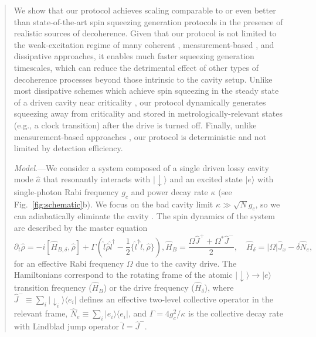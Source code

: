 \begin{abstract}
We show that our protocol achieves scaling comparable to or even better than state-of-the-art spin squeezing generation protocols in the presence of realistic sources of decoherence. 
Given that our protocol is not limited to the weak-excitation  regime of many coherent \cite{Schleier-Smith2010, Borregaard2017, Pedrozo-Penafiel2020, Colombo2022, Borregaard2017a, Luo2024, Leroux2010, Braverman2019, Barberena2023b}, measurement-based \cite{Schleier-Smith2010a, Cox2016, Hosten2016, Thomsen2002, Chen2014,Bao2020, Bowden2020, Robinson2022, Greve2022, Barberena2023b}, and dissipative \cite{DallaTorre2013} approaches, it enables much faster squeezing generation timescales, which can reduce the detrimental effect of other types of decoherence processes beyond those intrinsic to the cavity setup. Unlike most dissipative schemes which achieve spin squeezing in the steady state of a driven cavity near criticality \cite{DallaTorre2013, Lee2014a, Fernandez-Lorenzo2017, Groszkowski2022,Pavlov2023, Barberena2024,Gonzalez-Tudela2013, Wolfe2014, Somech2024}, our protocol dynamically generates squeezing away from criticality and stored in metrologically-relevant states (e.g., a clock transition) after the drive is turned off. Finally, unlike measurement-based approaches \cite{Thomsen2002,Schleier-Smith2010a, Chen2014, Cox2016, Hosten2016, Bao2020, Bowden2020, Robinson2022, Greve2022, Barberena2023b}, our protocol is deterministic and not limited by detection efficiency.

\emph{Model}.---We consider a system composed of a single driven lossy cavity mode $\hat a$ that resonantly interacts with $|{\downarrow} \rangle$ and an excited state $|e \rangle$ with single-photon Rabi frequency $g_c$ and power decay rate $\kappa$ (see Fig.~\ref{fig:schematic}b). We focus on the bad cavity limit $\kappa \gg \sqrt{N} g_c$,
so we can adiabatically eliminate the cavity \cite{suppcite}.
The spin dynamics of the system are described by the master equation
\begin{subequations}
\begin{equation}
\label{eq:spin_model}
\partial_t \hat\rho = - i [\hat H_{B,\delta} ,\hat\rho] + \Gamma \left( \hat l \hat\rho \hat l^\dagger - \frac{1}{2} \{\hat l^\dagger \hat l, \hat\rho \} \right),
\end{equation}
\begin{equation}
    \hat H_B = \frac{\Omega \hat J^+ + \Omega^* \hat J^-}{2}, \quad \hat H_\delta = |\Omega| \hat J_x - \delta \hat N_e,
\end{equation}
\end{subequations}
for an effective Rabi frequency $\Omega$ due to the cavity drive. The Hamiltonians correspond to the rotating frame of the atomic $|{\downarrow}\rangle \to |e\rangle$ transition frequency ($\hat H_B$) or the drive frequency ($\hat H_\delta$), where $\hat J^- \equiv \sum_i |{\downarrow}_i\rangle \langle e_i|$ defines an effective two-level collective operator in the relevant frame, $\hat N_e \equiv \sum_i |e_i\rangle \langle e_i|$, and $\Gamma=4 g_c^2/\kappa$ is the collective decay rate with Lindblad jump operator $\hat l = \hat J^-$. 


\end{abstract}
